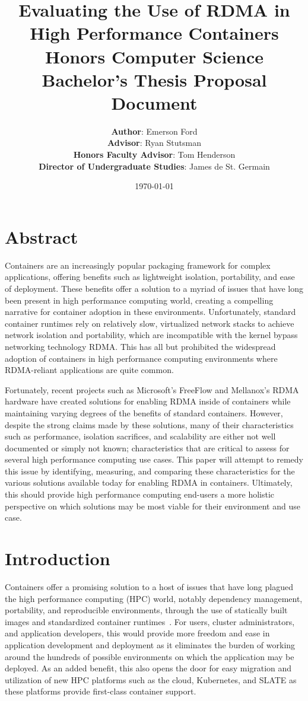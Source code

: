 \documentclass[12pt,titlepage]{article}
\title{\Large\textbf{Evaluating the Use of RDMA in High Performance Containers} \\
Honors Computer Science Bachelor's Thesis Proposal Document}
\author{\textbf{Author}: Emerson Ford \\
\textbf{Advisor}: Ryan Stutsman \\
\textbf{Honors Faculty Advisor}: Tom Henderson \\
\textbf{Director of Undergraduate Studies}: James de St. Germain }
\date{\today}
\begin{document}
\maketitle

\section*{Abstract}
Containers are an increasingly popular packaging framework for complex applications, offering benefits such as lightweight isolation, portability, and ease of deployment.
These benefits offer a solution to a myriad of issues that have long been present in high performance computing world, creating a compelling narrative for container adoption in these environments.
Unfortunately, standard container runtimes rely on relatively slow, virtualized network stacks to achieve network isolation and portability, which are incompatible with the kernel bypass networking technology RDMA\@.
This has all but prohibited the widespread adoption of containers in high performance computing environments where RDMA-reliant applications are quite common.

Fortunately, recent projects such as Microsoft's FreeFlow and Mellanox's RDMA hardware have created solutions for enabling RDMA inside of containers while maintaining varying degrees of the benefits of standard containers.
However, despite the strong claims made by these solutions, many of their characteristics such as performance, isolation sacrifices, and scalability are either not well documented or simply not known; characteristics that are critical to assess for several high performance computing use cases.
This paper will attempt to remedy this issue by identifying, measuring, and comparing these characteristics for the various solutions available today for enabling RDMA in containers.
Ultimately, this should provide high performance computing end-users a more holistic perspective on which solutions may be most viable for their environment and use case.

\section{Introduction}
Containers offer a promising solution to a host of issues that have long plagued the high performance computing (HPC) world, notably dependency management, portability, and reproducible environments, through the use of statically built images and standardized container runtimes~\cite{containershpc}.
For users, cluster administrators, and application developers, this would provide more freedom and ease in application development and deployment as it eliminates the burden of working around the hundreds of possible environments on which the application may be deployed.
As an added benefit, this also opens the door for easy migration and utilization of new HPC platforms such as the cloud, Kubernetes, and SLATE as these platforms provide first-class container support.
\end{document}
